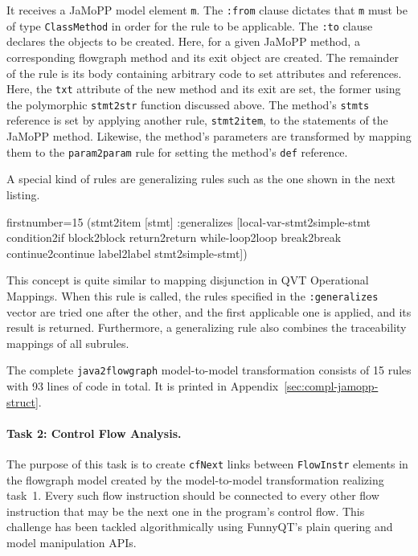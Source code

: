 \documentclass[submission]{eptcs}
\begin{document}
It receives a JaMoPP model element \verb|m|.  The \verb|:from| clause dictates
that \verb|m| must be of type \verb|ClassMethod| in order for the rule to be
applicable.  The \verb|:to| clause declares the objects to be created.  Here,
for a given JaMoPP method, a corresponding flowgraph method and its exit object
are created.  The remainder of the rule is its body containing arbitrary code
to set attributes and references.  Here, the \verb|txt| attribute of the new
method and its exit are set, the former using the polymorphic \verb|stmt2str|
function discussed above.  The method's \verb|stmts| reference is set by
applying another rule, \verb|stmt2item|, to the statements of the JaMoPP
method.  Likewise, the method's parameters are transformed by mapping them to
the \verb|param2param| rule for setting the method's \verb|def| reference.

A special kind of rules are generalizing rules such as the one shown in the
next listing.

\begin{clojurecode*}{firstnumber=15}
  (stmt2item [stmt]
      :generalizes [local-var-stmt2simple-stmt condition2if block2block
                    return2return while-loop2loop break2break continue2continue
                    label2label stmt2simple-stmt])
\end{clojurecode*}

This concept is quite similar to mapping disjunction in QVT Operational
Mappings.  When this rule is called, the rules specified in the
\verb|:generalizes| vector are tried one after the other, and the first
applicable one is applied, and its result is returned.  Furthermore, a
generalizing rule also combines the traceability mappings of all subrules.

The complete \verb|java2flowgraph| model-to-model transformation consists of 15
rules with 93 lines of code in total.  It is printed in
Appendix~\ref{sec:compl-jamopp-struct}.


\paragraph{Task 2: Control Flow Analysis.}
\label{sec:task-2}

The purpose of this task is to create \verb|cfNext| links between
\verb|FlowInstr| elements in the flowgraph model created by the model-to-model
transformation realizing task~1.  Every such flow instruction should be
connected to every other flow instruction that may be the next one in the
program's control flow.  This challenge has been tackled algorithmically using
FunnyQT's plain quering and model manipulation APIs.
\end{document}
